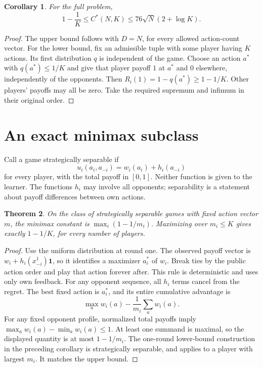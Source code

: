 \documentclass[11pt]{article}
\newtheorem{theorem}{Theorem}
\newtheorem{corollary}[theorem]{Corollary}
\begin{document}
\begin{corollary}
For the full problem,
\[
 1-\frac1K\leq C^*(N,K)\leq76\sqrt N(2+\log K).
\]
\end{corollary}
\begin{proof}
The upper bound follows with $D=N$, for every allowed action-count vector.
For the lower bound, fix an admissible tuple with some player having $K$
actions. Its first distribution $q$ is independent of the game.
Choose an action $a^*$ with $q(a^*)\leq1/K$ and give that player payoff
$1$ at $a^*$ and $0$ elsewhere, independently of the opponents.
Then $R_i(1)=1-q(a^*)\geq1-1/K$. Other players' payoffs may all be zero.
Take the required supremum and infimum in their original order.
\end{proof}

\section{An exact minimax subclass}
Call a game strategically separable if
\[
 u_i(a_i,a_{-i})=w_i(a_i)+h_i(a_{-i})
\]
for every player, with the total payoff in $[0,1]$. Neither function is
given to the learner. The functions $h_i$ may involve all opponents;
separability is a statement about payoff differences between own actions.

\begin{theorem}\label{thm:separable}
On the class of strategically separable games with fixed action vector
$m$, the minimax constant is $\max_i(1-1/m_i)$. Maximizing over
$m_i\leq K$ gives exactly $1-1/K$, for every number of players.
\end{theorem}
\begin{proof}
Use the uniform distribution at round one. The observed payoff vector
is $w_i+h_i(x_{-i}^1)\mathbf1$, so it identifies a maximizer $a_i^*$
of $w_i$. Break ties by the public action order and play that action
forever after. This rule is deterministic and uses only own feedback.
For any opponent sequence, all $h_i$ terms cancel from the regret.
The best fixed action is $a_i^*$, and its entire cumulative advantage is
\[
 \max_aw_i(a)-\frac1{m_i}\sum_aw_i(a).
\]
For any fixed opponent profile, normalized total payoffs imply
$\max_aw_i(a)-\min_aw_i(a)\leq1$. At least one summand is maximal,
so the displayed quantity is at most $1-1/m_i$.
The one-round lower-bound construction in the preceding corollary is
strategically separable, and applies to a player with largest $m_i$.
It matches the upper bound.
\end{proof}
\end{document}
